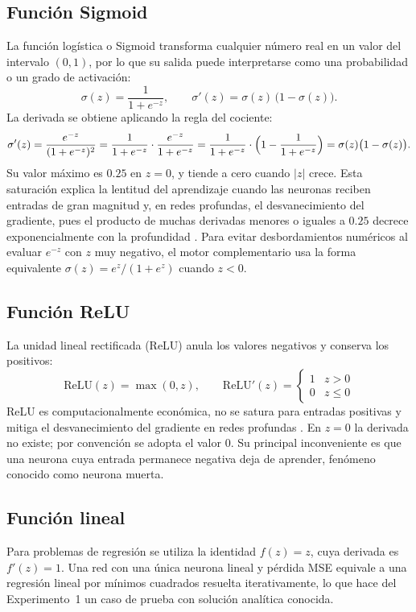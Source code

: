 \subsection{Función Sigmoid}
La función logística o Sigmoid transforma cualquier número real en un valor del intervalo $(0,1)$, por lo que su salida puede interpretarse como una probabilidad o un grado de activación:
\begin{equation}
\sigma(z) = \frac{1}{1+e^{-z}}, \qquad \sigma'(z) = \sigma(z)\,\bigl(1-\sigma(z)\bigr).\label{eq:sigmoid}
\end{equation}
La derivada se obtiene aplicando la regla del cociente:
\begin{equation*}
\sigma'(z) = \frac{e^{-z}}{(1+e^{-z})^2} = \frac{1}{1+e^{-z}}\cdot\frac{e^{-z}}{1+e^{-z}} = \frac{1}{1+e^{-z}}\cdot\Bigl(1-\frac{1}{1+e^{-z}}\Bigr) = \sigma(z)\bigl(1-\sigma(z)\bigr).
\end{equation*}
Su valor máximo es $0.25$ en $z=0$, y tiende a cero cuando $|z|$ crece. Esta saturación explica la lentitud del aprendizaje cuando las neuronas reciben entradas de gran magnitud y, en redes profundas, el desvanecimiento del gradiente, pues el producto de muchas derivadas menores o iguales a $0.25$ decrece exponencialmente con la profundidad \citep{lecun1998}. Para evitar desbordamientos numéricos al evaluar $e^{-z}$ con $z$ muy negativo, el motor complementario usa la forma equivalente $\sigma(z) = e^{z}/(1+e^{z})$ cuando $z<0$.

\subsection{Función ReLU}
La unidad lineal rectificada (ReLU) anula los valores negativos y conserva los positivos:
\begin{equation}
\mathrm{ReLU}(z) = \max(0, z), \qquad \mathrm{ReLU}'(z) = \begin{cases}1 & z>0\\ 0 & z\le 0\end{cases}\label{eq:relu}
\end{equation}
ReLU es computacionalmente económica, no se satura para entradas positivas y mitiga el desvanecimiento del gradiente en redes profundas \citep{glorot2010,he2015}. En $z=0$ la derivada no existe; por convención se adopta el valor $0$. Su principal inconveniente es que una neurona cuya entrada permanece negativa deja de aprender, fenómeno conocido como neurona muerta.

\subsection{Función lineal}
Para problemas de regresión se utiliza la identidad $f(z)=z$, cuya derivada es $f'(z)=1$. Una red con una única neurona lineal y pérdida MSE equivale a una regresión lineal por mínimos cuadrados resuelta iterativamente, lo que hace del Experimento~1 un caso de prueba con solución analítica conocida.

